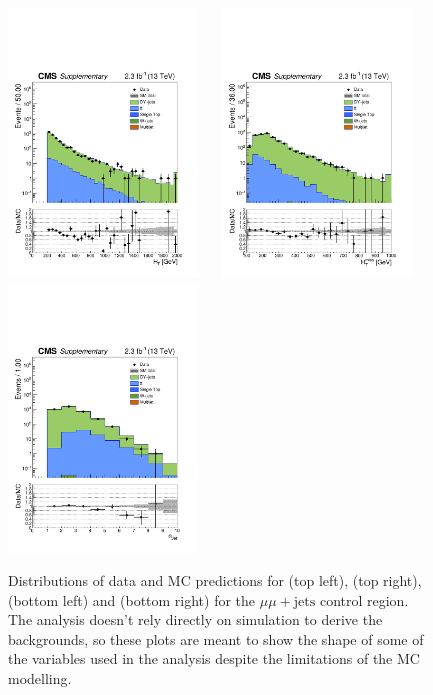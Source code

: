 \clearpage
\begin{figure}[tbhp]
    \caption{ 
    Distributions of data and MC predictions for \scalht (top left), \mht (top right), \nj (bottom left) and \nb (bottom right) 
    for the $\mu\mu+\mathrm{jets}$ control region. 
    The analysis doesn't rely directly on simulation to derive the backgrounds, 
    so these plots are meant to show the shape of some of the variables used in the analysis despite the limitations 
    of the MC modelling. 
    \label{fig:data-MC_plots_DoubleMu} }
  \begin{center}
     \includegraphics[width=0.45\textwidth]{figures/DoubleMu_ht40_all_all} ~~
     \includegraphics[width=0.45\textwidth]{figures/DoubleMu_mht40_pt_all_all} \\
     \includegraphics[width=0.45\textwidth]{figures/DoubleMu_nJet40_all_all} ~~

\end{center}
\end{figure}
